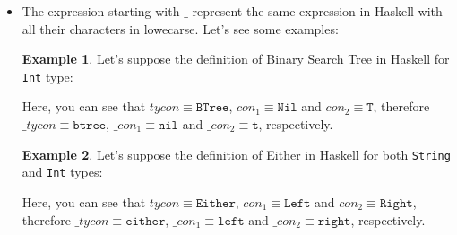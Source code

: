 \documentclass{report}
\theoremstyle{definition}
\newtheorem{example}{Example}[section]
\theoremstyle{definition}
\newcommand{\ttt}[1]{\texttt{#1}}
\begin{document}
\begin{itemize}
	\item The expression starting with $\_$ represent the same expression in Haskell with all their characters in lowecarse. Let's see some examples:
	      	      
	      \begin{example}
	      	Let's suppose the definition of Binary Search Tree in Haskell for \ttt{Int} type:
	      	
	      	Here, you can see that $tycon \equiv \ttt{BTree}$, $con_1 \equiv \ttt{Nil}$ and $con_2 \equiv \ttt{T}$, therefore $\_tycon \equiv \ttt{btree}$, $\_con_1 \equiv \ttt{nil}$ and $\_con_2 \equiv \ttt{t}$, respectively.
	      \end{example}
	      \begin{example}
	      	Let's suppose the definition of Either in Haskell for both \ttt{String} and \ttt{Int} types:
	      	
	      	Here, you can see that $tycon \equiv \ttt{Either}$, $con_1 \equiv \ttt{Left}$ and $con_2 \equiv \ttt{Right}$, therefore $\_tycon \equiv \ttt{either}$, $\_con_1 \equiv \ttt{left}$ and $\_con_2 \equiv \ttt{right}$, respectively.
	      \end{example}
	      

\end{itemize}
\end{document}
